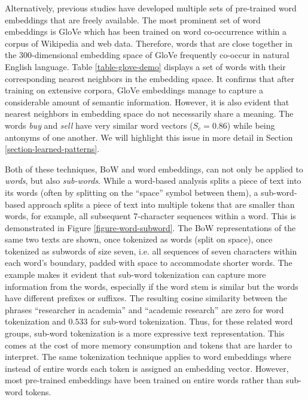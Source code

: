 Alternatively, previous studies have developed multiple sets of pre-trained word embeddings that are freely available. The most prominent set of word embeddings is GloVe  which has been trained on word co-occurrence within a corpus of Wikipedia and web data. Therefore, words that are close together in the 300-dimensional embedding space of GloVe frequently co-occur in natural English language. Table \ref{table-glove-demo} displays a set of words with their corresponding nearest neighbors in the embedding space. It confirms that after training on extensive corpora, GloVe embeddings manage to capture a considerable amount of semantic information. However, it is also evident that nearest neighbors in embedding space do not necessarily share a meaning. The words \emph{buy} and \emph{sell} have very similar word vectors ($S_c = 0.86$) while being antonyms of one another. We will highlight this issue in more detail in Section \ref{section-learned-patterns}.



Both of these techniques, BoW and word embeddings, can not only be applied to \emph{words}, but also \emph{sub-words}. While a word-based analysis splits a piece of text into its words (often by splitting on the ``space'' symbol between them), a sub-word-based approach splits a piece of text into multiple tokens that are smaller than words, for example, all subsequent 7-character sequences within a word. This is demonstrated in Figure \ref{figure-word-subword}. The BoW representations of the same two texts are shown, once tokenized as words (split on space), once tokenized as subwords of size seven, i.e. all sequences of seven characters within each word's boundary, padded with space to accommodate shorter words. The example makes it evident that sub-word tokenization can capture more information from the words, especially if the word stem is similar but the words have different prefixes or suffixes. The resulting cosine similarity between the phrases ``researcher in academia'' and ``academic research'' are zero for word tokenization and $0.533$ for sub-word tokenization. Thus, for these related word groups, sub-word tokenization is a more expressive text representation. This comes at the cost of more memory consumption and tokens that are harder to interpret. The same tokenization technique applies to word embeddings where instead of entire words each token is assigned an embedding vector. However, most pre-trained embeddings have been trained on entire words rather than sub-word tokens.


